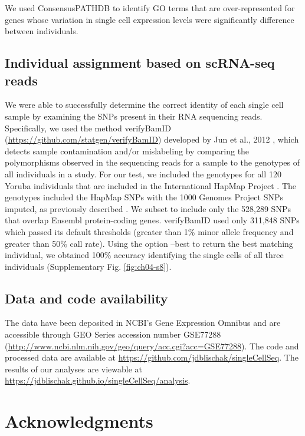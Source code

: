 We used ConsensusPATHDB \citep{Kamburov2011} to identify GO terms that
are over-represented for genes whose variation in single cell expression
levels were significantly difference between individuals.

\subsection{Individual assignment based on scRNA-seq
reads}\label{individual-assignment-based-on-scrna-seq-reads}

We were able to successfully determine the correct identity of each
single cell sample by examining the SNPs present in their RNA sequencing
reads. Specifically, we used the method verifyBamID
(\url{https://github.com/statgen/verifyBamID}) developed by Jun et al.,
2012 \citep{Jun2012}, which detects sample contamination and/or
mislabeling by comparing the polymorphisms observed in the sequencing
reads for a sample to the genotypes of all individuals in a study. For
our test, we included the genotypes for all 120 Yoruba individuals that
are included in the International HapMap Project
\citep{HapMapConsortium2005}. The genotypes included the HapMap SNPs with
the 1000 Genomes Project SNPs \citep{OneKGConsortium2012} imputed, as
previously described \citep{McVicker2013}. We subset to include only the
528,289 SNPs that overlap Ensembl protein-coding genes. verifyBamID used
only 311,848 SNPs which passed its default thresholds (greater than 1\%
minor allele frequency and greater than 50\% call rate). Using the
option --best to return the best matching individual, we obtained 100\%
accuracy identifying the single cells of all three individuals
(Supplementary Fig. \ref{fig:ch04-s8}).

\subsection{Data and code
availability}\label{ch04-data-and-code-availability}

The data have been deposited in NCBI's Gene Expression Omnibus
\citep{Edgar2002} and are accessible through GEO Series accession number
GSE77288
(\url{http://www.ncbi.nlm.nih.gov/geo/query/acc.cgi?acc=GSE77288}). The
code and processed data are available at
\url{https://github.com/jdblischak/singleCellSeq}. The results of our
analyses are viewable at
\url{https://jdblischak.github.io/singleCellSeq/analysis}.

\section{Acknowledgments}\label{ch04-acknowledgments}

